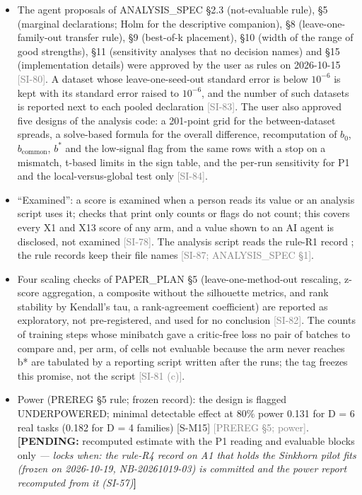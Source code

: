 \documentclass[11pt]{article}
\newcommand{\src}[1]{{\scriptsize\textcolor{gray}{[#1]}}}
\newcommand{\pending}[2]{{\color{BurntOrange}\textbf{[PENDING:} #1 \textit{--- locks when: #2}\textbf{]}}}
\begin{document}
\begin{itemize}
\item The agent proposals of ANALYSIS\_SPEC \S2.3 (not-evaluable rule), \S5 (marginal declarations; Holm for the descriptive companion), \S8 (leave-one-family-out transfer rule), \S9 (best-of-k placement), \S10 (width of the range of good strengths), \S11 (sensitivity analyses that no decision names) and \S15 (implementation details) were approved by the user as rules on 2026-10-15 \src{SI-80}. A dataset whose leave-one-seed-out standard error is below $10^{-6}$ is kept with its standard error raised to $10^{-6}$, and the number of such datasets is reported next to each pooled declaration \src{SI-83}. The user also approved five designs of the analysis code: a 201-point grid for the between-dataset spreads, a solve-based formula for the overall difference, recomputation of $b_0$, $b_{\mathrm{common}}$, $b^*$ and the low-signal flag from the same rows with a stop on a mismatch, t-based limits in the sign table, and the per-run sensitivity for P1 and the local-versus-global test only \src{SI-84}.
\item ``Examined'': a score is examined when a person reads its value or an analysis script uses it; checks that print only counts or flags do not count; this covers every X1 and X13 score of any arm, and a value shown to an AI agent is disclosed, not examined \src{SI-78}. The analysis script reads the rule-R1 record ; the rule records keep their file names \src{SI-87; ANALYSIS\_SPEC \S1}.
\item Four scaling checks of PAPER\_PLAN \S5 (leave-one-method-out rescaling, z-score aggregation, a composite without the silhouette metrics, and rank stability by Kendall's tau, a rank-agreement coefficient) are reported as exploratory, not pre-registered, and used for no conclusion \src{SI-82}. The counts of training steps whose minibatch gave a critic-free loss no pair of batches to compare and, per arm, of cells not evaluable because the arm never reaches b* are tabulated by a reporting script written after the runs; the tag freezes this promise, not the script \src{SI-81 (c)}.
\item Power (PREREG \S5 rule; frozen record): the design is flagged UNDERPOWERED; minimal detectable effect at 80\% power 0.131 for D = 6 real tasks (0.182 for D = 4 families) [S-M15] \src{PREREG \S5;  power}. \pending{recomputed estimate with the P1 reading and evaluable blocks only}{the rule-R4 record on A1 that holds the Sinkhorn pilot fits (frozen on 2026-10-19, NB-20261019-03) is committed and the power report recomputed from it (SI-57)}

\end{itemize}
\end{document}
